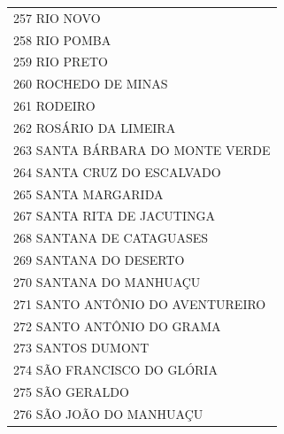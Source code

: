 \documentclass{article}
\begin{document}
\begin{longtable}[c]{m{18cm}}
\multicolumn{1}{l}{ \hspace{2em} 257 RIO NOVO } \\
\multicolumn{1}{l}{ \hspace{2em} 258 RIO POMBA } \\
\multicolumn{1}{l}{ \hspace{2em} 259 RIO PRETO } \\
\multicolumn{1}{l}{ \hspace{2em} 260 ROCHEDO DE MINAS } \\
\multicolumn{1}{l}{ \hspace{2em} 261 RODEIRO } \\
\multicolumn{1}{l}{ \hspace{2em} 262 ROSÁRIO DA LIMEIRA } \\
\multicolumn{1}{l}{ \hspace{2em} 263 SANTA BÁRBARA DO MONTE VERDE } \\
\multicolumn{1}{l}{ \hspace{2em} 264 SANTA CRUZ DO ESCALVADO } \\
\multicolumn{1}{l}{ \hspace{2em} 265 SANTA MARGARIDA } \\
\multicolumn{1}{l}{ \hspace{2em} 267 SANTA RITA DE JACUTINGA } \\
\multicolumn{1}{l}{ \hspace{2em} 268 SANTANA DE CATAGUASES } \\
\multicolumn{1}{l}{ \hspace{2em} 269 SANTANA DO DESERTO } \\
\multicolumn{1}{l}{ \hspace{2em} 270 SANTANA DO MANHUAÇU } \\
\multicolumn{1}{l}{ \hspace{2em} 271 SANTO ANTÔNIO DO AVENTUREIRO } \\
\multicolumn{1}{l}{ \hspace{2em} 272 SANTO ANTÔNIO DO GRAMA } \\
\multicolumn{1}{l}{ \hspace{2em} 273 SANTOS DUMONT } \\
\multicolumn{1}{l}{ \hspace{2em} 274 SÃO FRANCISCO DO GLÓRIA } \\
\multicolumn{1}{l}{ \hspace{2em} 275 SÃO GERALDO } \\
\multicolumn{1}{l}{ \hspace{2em} 276 SÃO JOÃO DO MANHUAÇU } \\

\end{longtable}
\end{document}
